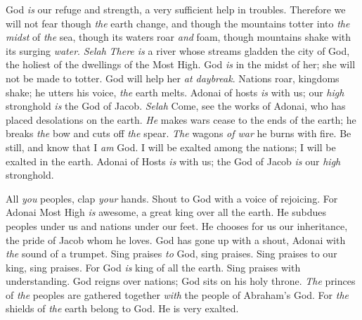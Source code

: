 \begin{biblechapter} %
 God \textit{is} our refuge and strength, 
a very sufficient help in troubles.
\verse Therefore we will not fear though \textit{the} earth change, 
and though the mountains totter into \textit{the} \textit{midst} of \textit{the} sea,
\verse though its waters roar \textit{and} foam, 
though mountains shake with its surging \textit{water}. \textit{Selah}
\verse \textit{There is} a river whose streams gladden the city of God, 
the holiest of the dwellings of the Most High.
\verse God \textit{is} in the midst of her; 
she will not be made to totter. 
God will help her \textit{at daybreak}.
\verse Nations roar, kingdoms shake; 
he utters his voice, \textit{the} earth melts.
\verse Adonai of hosts \textit{is} with us; 
our \textit{high} stronghold \textit{is} the God of Jacob. \textit{Selah}
\verse Come, see the works of Adonai, 
who has placed desolations on the earth.
\verse \textit{He} makes wars cease to the ends of the earth; 
he breaks \textit{the} bow and cuts off \textit{the} spear. 
\textit{The} wagons \textit{of war} he burns with fire.
\verse Be still, and know that I \textit{am} God. 
I will be exalted among the nations; 
I will be exalted in the earth.
\verse Adonai of Hosts \textit{is} with us; 
the God of Jacob \textit{is} our \textit{high} stronghold.
\end{biblechapter}

\begin{biblechapter} %
 All \textit{you} peoples, clap \textit{your} hands. 
Shout to God with a voice of rejoicing.
\verse For Adonai Most High \textit{is} awesome, 
a great king over all the earth.
\verse He subdues peoples under us 
and nations under our feet.
\verse He chooses for us our inheritance, 
the pride of Jacob whom he loves.
\verse God has gone up with a shout, 
Adonai with \textit{the} sound of a trumpet.
\verse Sing praises \textit{to} God, sing praises. 
Sing praises to our king, sing praises.
\verse For God \textit{is} king of all the earth. 
Sing praises with understanding.
\verse God reigns over nations; 
God sits on his holy throne.
\verse \textit{The} princes of \textit{the} peoples are gathered together 
\textit{with} the people of Abraham’s God. 
For \textit{the} shields of \textit{the} earth belong to God. 
He is very exalted.
\end{biblechapter}

